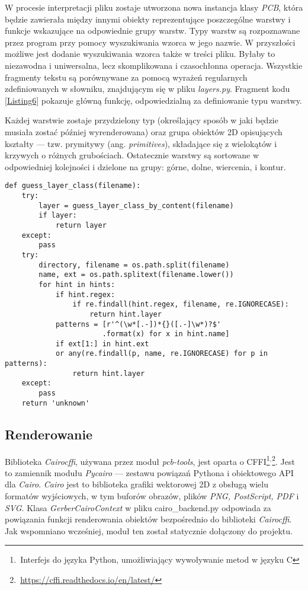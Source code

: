 \documentclass{xmgr}
\begin{document}
W procesie interpretacji pliku zostaje utworzona nowa instancja klasy \emph{PCB}, która będzie zawierała między innymi obiekty reprezentujące poszczególne warstwy i funkcje wskazujące na odpowiednie grupy warstw. Typy warstw są rozpoznawane przez program przy pomocy wyszukiwania wzorca w jego nazwie. W przyszłości możliwe jest dodanie wyszukiwania wzorca także w treści pliku. Byłaby to niezawodna i uniwersalna, lecz skomplikowana i czasochłonna operacja. Wszystkie fragmenty tekstu są porównywane za pomocą wyrażeń regularnych zdefiniowanych w słowniku, znajdującym się w pliku \emph{layers.py}. Fragment kodu \ref{Listing6} pokazuje główną funkcję, odpowiedzialną za definiowanie typu warstwy.

Każdej warstwie zostaje przydzielony typ (określający sposób w jaki będzie musiała zostać później wyrenderowana) oraz grupa obiektów 2D opisujących kształty --- tzw. prymitywy (ang. \emph{primitives}), składające się z wielokątów i krzywych o różnych grubościach. Ostatecznie warstwy są sortowane w odpowiedniej kolejności i dzielone na grupy: górne, dolne, wiercenia, i kontur.

\newpage
{}
\begin{lstlisting}
def guess_layer_class(filename):
    try:
        layer = guess_layer_class_by_content(filename)
        if layer:
            return layer
    except:
        pass
    try:
        directory, filename = os.path.split(filename)
        name, ext = os.path.splitext(filename.lower())
        for hint in hints:
            if hint.regex:
                if re.findall(hint.regex, filename, re.IGNORECASE):
                    return hint.layer
            patterns = [r'^(\w*[.-])*{}([.-]\w*)?$'
                       .format(x) for x in hint.name]
            if ext[1:] in hint.ext 
            or any(re.findall(p, name, re.IGNORECASE) for p in patterns):
                return hint.layer
    except:
        pass
    return 'unknown'
\end{lstlisting}

\subsection{Renderowanie}
Biblioteka \emph{Cairocffi}, używana przez moduł \emph{pcb-tools}, jest oparta o CFFI\footnote{\,Interfejs do języka Python, umożliwiający wywoływanie metod w języku C}$^{,}$\footnote{\,\url{https://cffi.readthedocs.io/en/latest/}}. Jest to zamiennik modułu \emph{Pycairo} --- zestawu powiązań Pythona i obiektowego API dla \emph{Cairo}. \emph{Cairo} jest to biblioteka grafiki wektorowej 2D z obsługą wielu formatów wyjściowych, w tym buforów obrazów, plików \emph{PNG, PostScript, PDF} i \emph{SVG}. 
Klasa \emph{GerberCairoContext} w pliku cairo\_backend.py odpowiada za powiązania funkcji renderowania obiektów bezpośrednio do biblioteki \emph{Cairocffi}. Jak wspomniano wcześniej, moduł ten został statycznie dołączony do projektu.
\end{document}
